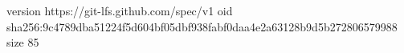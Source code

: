 version https://git-lfs.github.com/spec/v1
oid sha256:9c4789dba51224f5d604bf05dbf938fabf0daa4e2a63128b9d5b272806579988
size 85
